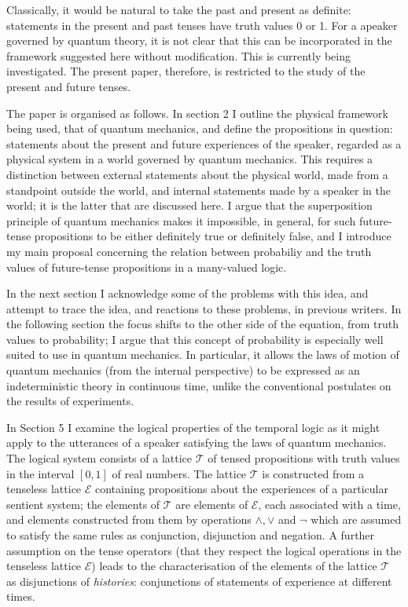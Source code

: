 \documentclass[12pt,reqno]{article}
\renewcommand{\(}{\left(}
\renewcommand{\)}{\right)}
\newcommand{\E}{\mathcal{E}}
\newcommand{\T}{\mathcal{T}}
\newcommand{\<}{\langle}
\renewcommand{\>}{\rangle}
\theoremstyle{plain} %
\begin{document}
 Classically, it would be natural to take the past and present as definite: statements in the present and past tenses have truth values 0 or 1. For a apeaker governed by quantum theory, it is not clear that this can be incorporated in the framework suggested here without modification. This is currently being investigated. The present paper, therefore, is restricted to the study of the present and future tenses.


The paper is organised as follows. In section 2 I outline the physical framework being used, that of quantum mechanics, and define the propositions in question: statements about the present and future experiences of the speaker, regarded as a physical system in a world governed by quantum mechanics. This requires a distinction between external statements about the physical world, made from a standpoint outside the world, and internal statements made by a speaker in the world; it is the latter that are discussed here. I argue that the superposition principle of quantum mechanics makes it impossible, in general, for such future-tense propositions to be either definitely true or definitely false, and I introduce my main proposal concerning the relation between probabiliy and the truth values of future-tense propositions in a many-valued logic.  

In the next section I acknowledge some of the problems with this idea, and attempt to trace the idea, and reactions to these problems, in previous writers. In the following section the focus shifts to the other side of the equation, from truth values to probability; I argue that this concept of probability is especially well suited to use in quantum mechanics. In particular, it allows the laws of motion of quantum mechanics (from the internal perspective) to be expressed as an indeterministic theory in continuous time, unlike the conventional postulates on the results of experiments.

 In Section 5 I examine the logical properties of the temporal logic as it might apply to the utterances of a speaker satisfying the laws of quantum mechanics. The logical system consists of a lattice $\T$ of tensed propositions with truth values in the interval $[0,1]$ of real numbers. The lattice $\T$ is constructed from a tenseless lattice $\E$ containing propositions about the experiences of a particular sentient system; the elements of $\T$ are elements of $\E$, each associated with a time, and elements constructed from them by operations $\land, \lor$ and $\lnot$ which are assumed to satisfy the same rules as conjunction, disjunction and negation. A further assumption on the tense operators (that they respect the logical operations in the tenseless lattice $\E$) leads to the characterisation of the elements of the lattice $\T$ as disjunctions of \emph{histories}: conjunctions of statements of experience at different times. 
\end{document}
